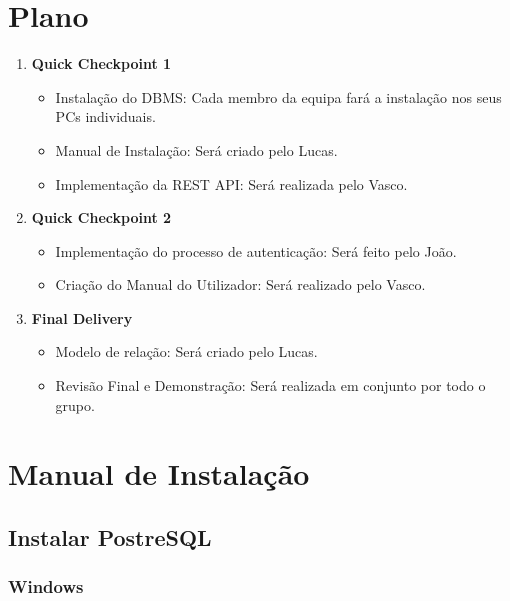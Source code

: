 \documentclass[a4paper, 11pt]{article}
\begin{document}
\section{Plano}

\begin{enumerate}
  \item \textbf{Quick Checkpoint 1}
    \begin{itemize}
      \item Instalação do DBMS: Cada membro da equipa fará a instalação nos seus PCs individuais.
      \item Manual de Instalação: Será criado pelo Lucas.
      \item Implementação da REST API: Será realizada pelo Vasco.
    \end{itemize}

  \item\textbf{Quick Checkpoint 2}
    \begin{itemize}
      \item Implementação do processo de autenticação: Será feito pelo João.
      \item Criação do Manual do Utilizador: Será realizado pelo Vasco.
    \end{itemize}

  \item \textbf{Final Delivery}
    \begin{itemize}
      \item Modelo de relação: Será criado pelo Lucas. 
      \item Revisão Final e Demonstração: Será realizada em conjunto por todo o grupo.
    \end{itemize}
\end{enumerate}


\section{Manual de Instalação}

\subsection{Instalar PostreSQL}

\subsubsection{Windows}
\end{document}
